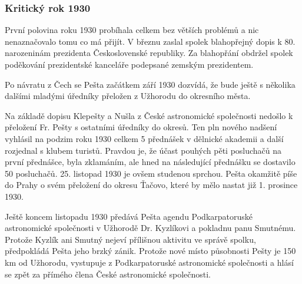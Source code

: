 \documentclass[10pt,a5paper,twoside]{book}
\begin{document}
\subsubsection*{Kritický rok 1930}
\par První polovina roku 1930 probíhala celkem bez větších problémů a nic nenaznačovalo tomu co má přijít. V březnu zaslal spolek blahopřejný dopis k 80. narozeninám prezidenta Československé republiky. Za blahopřání obdržel spolek poděkování prezidentské kanceláře podepsané zemským prezidentem. 
\par Po návratu z Čech se Pešta začátkem září 1930 dozvídá, že bude ještě s několika dalšími mladými úředníky přeložen z Užhorodu do okresního města. 
\par Na základě dopisu Klepešty a Nušla z České astronomické společnosti nedošlo k přeložení Fr. Pešty s ostatními úředníky do okresů. Ten pln nového nadšení vyhlásil na podzim roku 1930 celkem 5 přednášek v dělnické akademii a další rozjednal s klubem turistů. Pravdou je, že účast pouhých pěti posluchačů na první přednášce, byla zklamáním, ale hned na následující přednášku se dostavilo 50 posluchačů. 25. listopad 1930 je ovšem studenou sprchou. Pešta okamžitě píše do Prahy o svém přeložení do okresu Ťačovo, které by mělo nastat již 1. prosince 1930. 
\par Ještě koncem listopadu 1930 předává Pešta agendu Podkarpatoruské astronomické společnosti v Užhorodě Dr. Kyzlíkovi a pokladnu panu Smutnému. Protože Kyzlík ani Smutný nejeví přílišnou aktivitu ve správě spolku, předpokládá Pešta jeho brzký zánik. Protože nové místo působnosti Pešty je 150 km od Užhorodu, vystupuje z Podkarpatoruské astronomické společnosti a hlásí se zpět za přímého člena České astronomické společnosti. 
\end{document}
